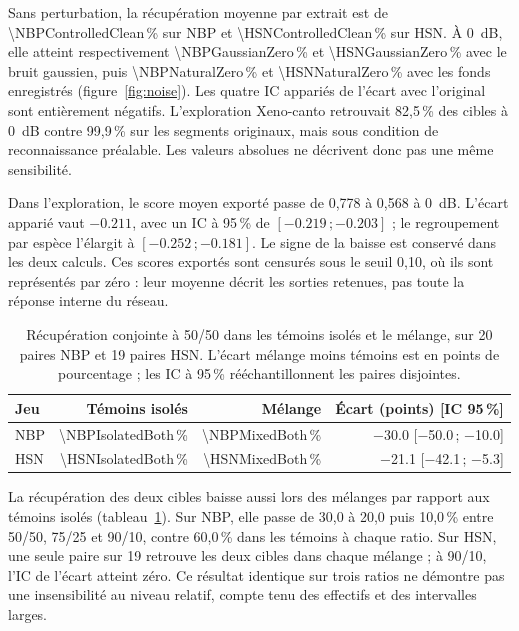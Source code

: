 \documentclass{technology_watch}
\begin{document}
Sans perturbation, la récupération moyenne par extrait est de
\num{\NBPControlledClean}\,\% sur NBP et \num{\HSNControlledClean}\,\% sur HSN.
À 0~dB, elle atteint respectivement \num{\NBPGaussianZero}\,\% et
\num{\HSNGaussianZero}\,\% avec le bruit gaussien, puis
\num{\NBPNaturalZero}\,\% et \num{\HSNNaturalZero}\,\% avec les fonds
enregistrés (figure~\ref{fig:noise}). Les quatre IC appariés de l'écart avec
l'original sont entièrement négatifs. L'exploration Xeno-canto retrouvait
82,5\,\% des cibles à 0~dB contre 99,9\,\% sur les segments originaux,
mais sous condition de reconnaissance préalable. Les valeurs absolues ne
décrivent donc pas une même sensibilité.

Dans l'exploration, le score moyen exporté passe de 0,778 à 0,568 à 0~dB.
L'écart apparié vaut $\num{-0.211}$, avec un IC à 95\,\% de
$[\num{-0.219}\,;\num{-0.203}]$ ; le regroupement par espèce l'élargit à
$[\num{-0.252}\,;\num{-0.181}]$. Le signe de la baisse est conservé dans
les deux calculs. Ces scores exportés sont censurés sous le seuil 0,10,
où ils sont représentés par zéro : leur moyenne décrit les sorties retenues,
pas toute la réponse interne du réseau.

\begin{table}[!t]
\centering\small
\caption{Récupération conjointe à 50/50 dans les témoins isolés et le mélange,
sur 20 paires NBP et 19 paires HSN. L'écart mélange moins témoins est en points
de pourcentage ; les IC à 95\,\% rééchantillonnent les paires disjointes.}
\label{tab:overlap}
\begin{tabular}{lrrr}
\toprule
Jeu & Témoins isolés & Mélange & Écart (points) [IC 95\,\%] \\
\midrule
NBP & \num{\NBPIsolatedBoth}\,\% & \num{\NBPMixedBoth}\,\% & \num{-30.0} [\num{-50.0}\,; \num{-10.0}] \\
HSN & \num{\HSNIsolatedBoth}\,\% & \num{\HSNMixedBoth}\,\% & \num{-21.1} [\num{-42.1}\,; \num{-5.3}] \\
\bottomrule
\end{tabular}
\end{table}

La récupération des deux cibles baisse aussi lors des mélanges par rapport
aux témoins isolés (tableau~\ref{tab:overlap}). Sur NBP, elle passe de 30,0
à 20,0 puis 10,0\,\% entre 50/50, 75/25 et 90/10, contre 60,0\,\% dans les
témoins à chaque ratio. Sur HSN, une seule paire sur 19 retrouve les deux
cibles dans chaque mélange ; à 90/10, l'IC de l'écart atteint zéro.
Ce résultat identique sur trois ratios ne démontre pas une insensibilité
au niveau relatif, compte tenu des effectifs et des intervalles larges.
\end{document}
